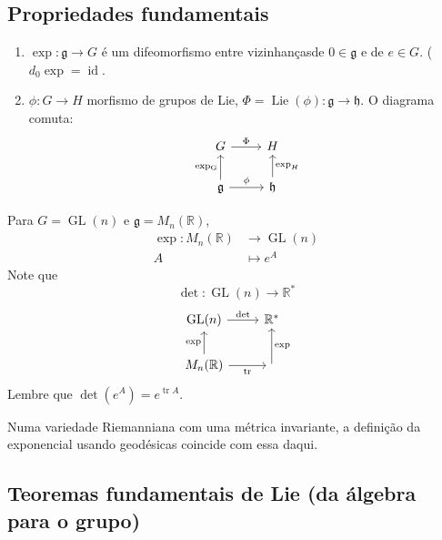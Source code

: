 \subsection{Propriedades fundamentais}

\begin{enumerate}
	\item $\operatorname{exp}: \mathfrak{g}\to G$ \'e um difeomorfismo entre vizinhançasde $0\in\mathfrak{g}$ e de $e\in G$. ($d_{0}\operatorname{exp}= \operatorname{id}$.

	\item $\phi:G\to H$ morfismo de grupos de Lie, $\Phi=\operatorname{Lie}(\phi) :\mathfrak{g} \to  \mathfrak{h}$. O diagrama comuta:
\[\begin{tikzcd}
	G\arrow[r,"\Phi"]&H\\
	\mathfrak{g}\arrow[u,"\operatorname{exp_G}"]\arrow[r,"\phi"]&\mathfrak{h}\arrow[u,"\operatorname{exp}_H",swap]
\end{tikzcd}\]
\end{enumerate}

\begin{example}
	Para $G=\operatorname{GL}(n)$ e $\mathfrak{g} =M_n(\mathbb{R})$,
	\begin{align*}
		\operatorname{exp}: M_n(\mathbb{R}) &\longrightarrow \operatorname{GL}(n) \\
		A &\longmapsto e^A
	\end{align*}
	Note que
	\[\det :\operatorname{GL}(n)\to \mathbb{R}^*\]
	\[\begin{tikzcd}
		\operatorname{GL}(n)\arrow[r,"\det "]&\mathbb{R}^*\\
		M_n(\mathbb{R})\arrow[u,"\operatorname{exp}"]\arrow[r,swap,"\operatorname{tr}"]&\arrow[u,"\operatorname{exp}",swap]
	\end{tikzcd}\]
	Lembre que $\det(e^A)=e^{\operatorname{tr}A}$.
\end{example}

\begin{remark}
	Numa variedade Riemanniana com uma m\'etrica invariante, a defini\c c\~ao da exponencial usando geod\'esicas coincide com essa daqui.
\end{remark}

\subsection{Teoremas fundamentais de Lie (da \'algebra para o grupo)}

